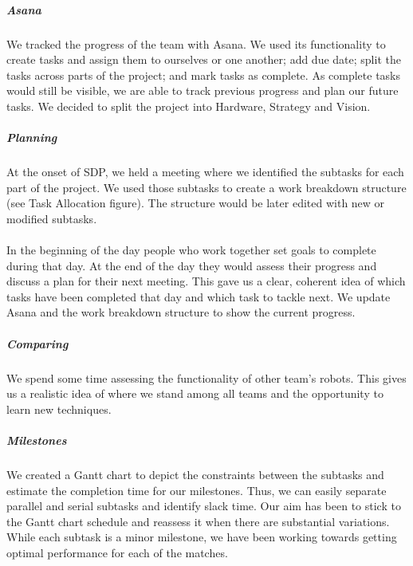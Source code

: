 \subparagraph{Asana}
We tracked the progress of the team with Asana. We used its functionality to create tasks and assign them to ourselves or one another; add due date; split the tasks across parts of the project; and mark tasks as complete. As complete tasks would still be visible, we are able to track previous progress and plan our future tasks. We decided to split the project into Hardware, Strategy and Vision.

\subparagraph{Planning}
At the onset of SDP, we held a meeting where we identified the subtasks for each part of the project. We used those subtasks to create a work breakdown structure (see Task Allocation figure). The structure would be later edited with new or modified subtasks.
\\ \\
In the beginning of the day people who work together set goals to complete during that day. At the end of the day they would assess their progress and discuss a plan for their next meeting. This gave us a clear, coherent idea of which tasks have been completed that day and which task to tackle next. We update Asana and the work breakdown structure to show the current progress.

\subparagraph{Comparing}
We spend some time assessing the functionality of other team's robots. This gives us a realistic idea of where we stand among all teams and the opportunity to learn new techniques.

\subparagraph{Milestones}
We created a Gantt chart to depict the constraints between the subtasks and estimate the completion time for our milestones. Thus, we can easily separate parallel and serial subtasks and identify slack time. Our aim has been to stick to the Gantt chart schedule and reassess it when there are substantial variations. While each subtask is a minor milestone, we have been working towards getting optimal performance for each of the matches.